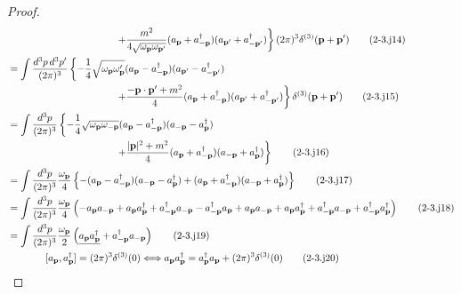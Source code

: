 \documentclass[a4paper,12pt]{article}
\begin{document}
\begin{proof}
\begin{align*}
    &\quad \hspace{3.5cm} \left. + \frac{m^2}{4\sqrt{\omega_{\mathbf{p}}\omega_{\mathbf{p}'}}} (a_{\mathbf{p}} + a^\dagger_{-\mathbf{p}})(a_{\mathbf{p}'} + a^\dagger_{-\mathbf{p}'})\right\} (2\pi)^3 \delta^{(3)}(\mathbf{p}+\mathbf{p}') \tag{2-3.j14}\\
    &= \int \frac{d^3 p \, d^3 p'}{(2\pi)^3} \left\{ -\frac{1}{4}\sqrt{\omega_{\mathbf{p}}\omega_{\mathbf{p}}'} (a_{\mathbf{p}} - a^\dagger_{-\mathbf{p}})(a_{\mathbf{p}'} - a^\dagger_{-\mathbf{p}'}) \right.\\
    &\quad \hspace{3.5cm} \left.+ \frac{-\mathbf{p}\cdot\mathbf{p}' + m^2}{4} (a_{\mathbf{p}} + a^\dagger_{-\mathbf{p}})(a_{\mathbf{p}'} + a^\dagger_{-\mathbf{p}'}) \right\} \delta^{(3)}(\mathbf{p}+\mathbf{p}') \tag{2-3.j15}\\
    &= \int \frac{d^3 p}{(2\pi)^3} \left\{ -\frac{1}{4}\sqrt{\omega_{\mathbf{p}}\omega_{-\mathbf{p}}} (a_{\mathbf{p}} - a^\dagger_{-\mathbf{p}})(a_{-\mathbf{p}} - a^\dagger_{\mathbf{p}}) \right. \\
    &\quad \hspace{3.5cm} \left.+ \frac{|\mathbf{p}|^2 + m^2}{4} (a_{\mathbf{p}} + a^\dagger_{-\mathbf{p}})(a_{-\mathbf{p}} + a^\dagger_{\mathbf{p}}) \right\} \tag{2-3.j16}\\
    &= \int \frac{d^3 p}{(2\pi)^3} \frac{\omega_{\mathbf{p}}}{4} \left\{ -(a_{\mathbf{p}} - a^\dagger_{-\mathbf{p}})(a_{-\mathbf{p}} - a^\dagger_{\mathbf{p}}) + (a_{\mathbf{p}} + a^\dagger_{-\mathbf{p}})(a_{-\mathbf{p}} + a^\dagger_{\mathbf{p}}) \right\} \tag{2-3.j17}\\
    &= \int \frac{d^3 p}{(2\pi)^3} \frac{\omega_{\mathbf{p}}}{4} \left( -a_{\mathbf{p}}a_{-\mathbf{p}} + a_{\mathbf{p}}a^\dagger_{\mathbf{p}} + a^\dagger_{-\mathbf{p}}a_{-\mathbf{p}} - a^\dagger_{-\mathbf{p}}a_{\mathbf{p}} + a_{\mathbf{p}}a_{-\mathbf{p}} + a_{\mathbf{p}}a^\dagger_{\mathbf{p}} + a^\dagger_{-\mathbf{p}}a_{-\mathbf{p}} + a^\dagger_{-\mathbf{p}}a^{\dagger}_{\mathbf{p}} \right) \tag{2-3.j18}\\
    &= \int \frac{d^3 p}{(2\pi)^3} \frac{\omega_{\mathbf{p}}}{2} \left( \underline{a_{\mathbf{p}}a^\dagger_{\mathbf{p}}} + a^\dagger_{-\mathbf{p}}a_{-\mathbf{p}} \right) \tag{2-3.j19}\\
    &\quad \hspace{1cm} [a_{\mathbf{p}}, a^\dagger_{\mathbf{p}}] = (2\pi)^3 \delta^{(3)}(0) \Longleftrightarrow a_{\mathbf{p}}a^\dagger_{\mathbf{p}} = a^\dagger_{\mathbf{p}}a_{\mathbf{p}} + (2\pi)^3 \delta^{(3)}(0) \tag{2-3.j20}\\

\end{align*}
\end{proof}
\end{document}

